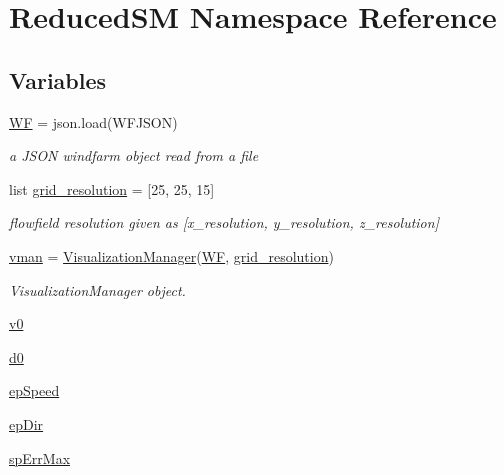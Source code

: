 \hypertarget{namespace_reduced_s_m}{}\section{Reduced\+SM Namespace Reference}
\label{namespace_reduced_s_m}
\subsection*{Variables}
\begin{DoxyCompactItemize}
\item 
\mbox{\hyperlink{namespace_reduced_s_m_ad2cb878a0bc5ba18176fff5ab9b02dc3}{WF}} = json.\+load(W\+F\+J\+S\+ON)
\begin{DoxyCompactList}\small\item\em a J\+S\+ON windfarm object read from a file \end{DoxyCompactList}\item 
list \mbox{\hyperlink{namespace_reduced_s_m_ac73e3bc6b17648d508dd822d76929524}{grid\+\_\+resolution}} = \mbox{[}25, 25, 15\mbox{]}
\begin{DoxyCompactList}\small\item\em flowfield resolution given as \mbox{[}x\+\_\+resolution, y\+\_\+resolution, z\+\_\+resolution\mbox{]} \end{DoxyCompactList}\item 
\mbox{\hyperlink{namespace_reduced_s_m_aea7c8ee42c44fbc9f8c3702567edc840}{vman}} = \mbox{\hyperlink{classvisualization__manager___d_j_1_1_visualization_manager}{Visualization\+Manager}}(\mbox{\hyperlink{namespace_reduced_s_m_ad2cb878a0bc5ba18176fff5ab9b02dc3}{WF}}, \mbox{\hyperlink{namespace_reduced_s_m_ac73e3bc6b17648d508dd822d76929524}{grid\+\_\+resolution}})
\begin{DoxyCompactList}\small\item\em Visualization\+Manager object. \end{DoxyCompactList}\item 
\mbox{\hyperlink{namespace_reduced_s_m_a67506428d79afaf78d10af90e7e90d3b}{v0}}
\item 
\mbox{\hyperlink{namespace_reduced_s_m_af7214d9d46df1ff209b258941ec86497}{d0}}
\item 
\mbox{\hyperlink{namespace_reduced_s_m_aa4f3b7b9255fe90c846c6e42d57ab5f1}{ep\+Speed}}
\item 
\mbox{\hyperlink{namespace_reduced_s_m_a2e00f0fe37b83224dc19800e4eb332a4}{ep\+Dir}}
\item 
\mbox{\hyperlink{namespace_reduced_s_m_a4d41ef5243c51b6b27a644ddd5984879}{sp\+Err\+Max}}

\end{DoxyCompactItemize}
